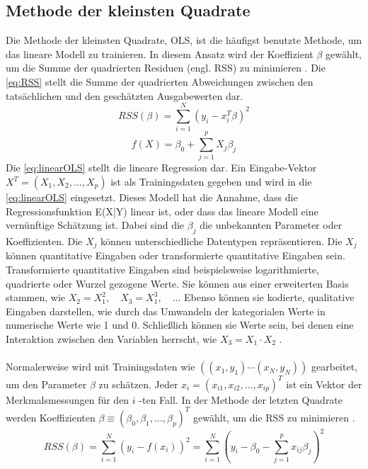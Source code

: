 \subsection{Methode der kleinsten Quadrate}
\label{methodederkleinstenquadrate}
Die Methode der kleinsten Quadrate, \ac{OLS}, ist die häufigst benutzte Methode, um das lineare Modell zu trainieren. In diesem Ansatz wird der Koeffizient $\beta$ gewählt, um die Summe der quadrierten Residuen (engl. \ac{RSS}) zu minimieren \cite{hastie2009elements}. Die \autoref{eq:RSS} stellt die Summe der quadrierten Abweichungen zwischen den tatsächlichen und den geschätzten Ausgabewerten dar. 
\begin{equation}
RSS(\beta) = \sum_{i=1}^{N} (y_i - x_i^T \beta)^2 
\label{eq:RSS}
\end{equation}
\begin{equation}
f(X) = \beta_0 + \sum_{j=1}^{p} X_j \beta_j 
\label{eq:linearOLS}
\end{equation}
Die \autoref{eq:linearOLS} stellt die lineare Regression dar. Ein Eingabe-Vektor \( X^T = (X_1, X_2, \ldots, X_p) \) ist als Trainingsdaten gegeben und wird in die \autoref{eq:linearOLS} eingesetzt. Dieses Modell hat die Annahme, dass die Regressionsfunktion E(X|Y) linear ist, oder dass das lineare Modell eine vernünftige Schätzung ist. Dabei sind die $\beta_j$ die unbekannten Parameter oder Koeffizienten. Die \( X_j \) können unterschiedliche Datentypen repräsentieren. Die \( X_j \) können quantitative Eingaben oder transformierte quantitative Eingaben sein. Transformierte quantitative Eingaben sind beispielsweise logarithmierte, quadrierte oder Wurzel gezogene Werte. Sie können aus einer erweiterten Basis stammen, wie \( X_2 = X_1^2, \quad X_3 = X_1^3,\quad \ldots \) Ebenso können sie kodierte, qualitative Eingaben darstellen, wie durch das Umwandeln der kategorialen Werte in numerische Werte wie 1 und 0. Schließlich können sie Werte sein, bei denen eine Interaktion zwischen den Variablen herrscht, wie \( X_3 = X_1 \cdot X_2 \) \cite{hastie2009elements}.\\\\
Normalerweise wird mit Trainingsdaten wie \( ( (x_1, y_1) \cdots (x_N, y_N) ) \) gearbeitet, um den Parameter $\beta$ zu schätzen. Jeder \( x_i = (x_{i1}, x_{i2}, \ldots, x_{ip})^T \) ist ein Vektor der Merkmalsmessungen für den \(i\) -ten Fall. In der Methode der letzten Quadrate werden Koeffizienten \( \beta \equiv (\beta_0, \beta_1, \ldots, \beta_p)^T \) gewählt, um die \ac{RSS} zu minimieren \cite{hastie2009elements}. 
\begin{equation}
RSS(\beta) = \sum_{i=1}^{N} (y_i - f(x_i))^2 
= \sum_{i=1}^{N} \left( y_i - \beta_0 - \sum_{j=1}^{p} x_{ij} \beta_j \right)^2
\label{eq:rsshoch2}
\end{equation}
